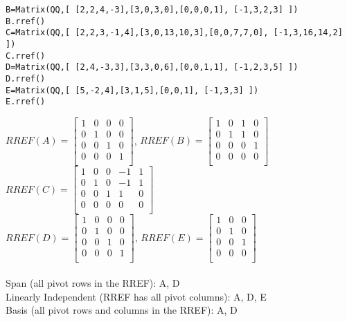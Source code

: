 \documentclass{article}
\begin{document}
\begin{verbatim}
B=Matrix(QQ,[ [2,2,4,-3],[3,0,3,0],[0,0,0,1], [-1,3,2,3] ])
B.rref()
C=Matrix(QQ,[ [2,2,3,-1,4],[3,0,13,10,3],[0,0,7,7,0], [-1,3,16,14,2] ])
C.rref()
D=Matrix(QQ,[ [2,4,-3,3],[3,3,0,6],[0,0,1,1], [-1,2,3,5] ])
D.rref()
E=Matrix(QQ,[ [5,-2,4],[3,1,5],[0,0,1], [-1,3,3] ])
E.rref()
\end{verbatim}

$
RREF(A) = \begin{bmatrix} 
1 & 0 & 0 & 0 \\ 
0 & 1 & 0 & 0 \\
0 & 0 & 1 & 0 \\
0 & 0 & 0 & 1 \\
\end{bmatrix}
$, $
RREF(B) = \begin{bmatrix} 
1 & 0 & 1 & 0 \\ 
0 & 1 & 1 & 0 \\
0 & 0 & 0 & 1 \\
0 & 0 & 0 & 0 \\
\end{bmatrix}
$ \\$
RREF(C) = \begin{bmatrix} 
1 & 0 & 0 & -1 & 1 \\ 
0 & 1 & 0 & -1 & 1 \\ 
0 & 0 & 1 & 1 & 0 \\ 
0 & 0 & 0 & 0 & 0 \\ 
\end{bmatrix}
$\\$RREF(D) = \begin{bmatrix} 
1 & 0 & 0 & 0 \\ 
0 & 1 & 0 & 0 \\
0 & 0 & 1 & 0 \\
0 & 0 & 0 & 1 \\
\end{bmatrix}
$, $RREF(E) = \begin{bmatrix} 
1 & 0 & 0\\ 
0 & 1 & 0\\
0 & 0 & 1\\
0 & 0 & 0\\
\end{bmatrix}
$\\
\\
Span (all pivot rows in the RREF): A, D\\
Linearly Independent (RREF has all pivot columns): A, D, E\\
Basis (all pivot rows and columns in the RREF): A, D\\
\end{document}
